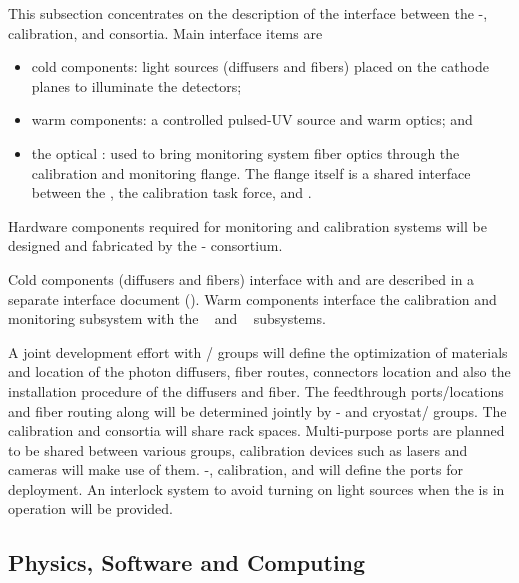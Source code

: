 This subsection concentrates on the description of the interface between the  -, calibration, and  consortia. 
Main interface items are
\begin{itemize}
    \item cold components: light sources (diffusers and fibers) placed on the cathode planes to illuminate the detectors;
    \item warm components: a controlled pulsed-UV source and warm optics; and 
 
    \item the optical \fdth: used to  bring monitoring system fiber optics through the calibration and monitoring flange.  The flange itself is a shared interface between the , the calibration task force, and .
\end{itemize}

Hardware components required for  monitoring and calibration systems will be designed and fabricated by the - consortium. 

Cold components (diffusers and fibers) interface with  and are described in a separate interface document (). Warm components interface the  calibration and monitoring subsystem with the ~ and ~ subsystems.

A joint development effort with / groups will define the optimization of materials and location of the photon diffusers, fiber routes, connectors location and also the installation procedure of the diffusers and fiber. The feedthrough ports/locations and fiber routing along  will be determined jointly by - and cryostat/ groups. The %
calibration and  %
consortia will share rack spaces. Multi-purpose ports are planned to be shared between various groups, calibration devices such as lasers and cameras will make use of them. %
-, calibration, and  will define the ports for deployment. An interlock system to avoid turning on light sources when the  is in operation will be provided.

\subsection{Physics, Software and Computing}

